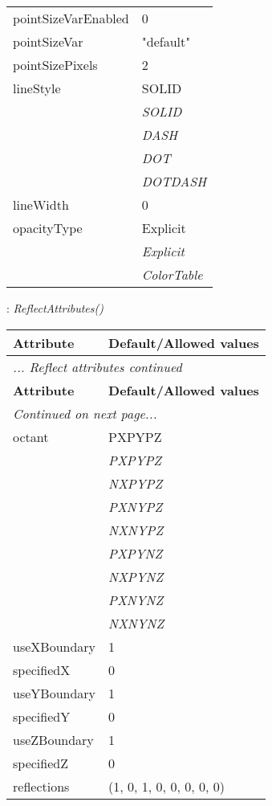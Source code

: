 \documentclass[10pt,a4paper]{report}
\begin{document}
\begin{longtable}{ll}
pointSizeVarEnabled  &  0 \\
pointSizeVar  &  "default" \\
pointSizePixels  &  2 \\
lineStyle  &  SOLID   \\
 & {\it  SOLID} \\
 & {\it  DASH} \\
 & {\it  DOT} \\
 & {\it  DOTDASH} \\
lineWidth  &  0 \\
opacityType  &  Explicit   \\
 & {\it  Explicit} \\
 & {\it  ColorTable} \\
\end{longtable}

\newpage

{}
: {\it ReflectAttributes() }\\[-3mm]

\begin{longtable}{ll}
{\bf Attribute} & {\bf Default/Allowed values} \\
\hline \hline
\endfirsthead
\multicolumn{2}{l}{{\it ... Reflect attributes continued}} \\
{\bf Attribute} & {\bf Default/Allowed values} \\
\hline \hline
\endhead
\hline
\multicolumn{2}{l}{{\it Continued on next page...}} \\
\endfoot
\hline
\endlastfoot

octant  &  PXPYPZ   \\
 & {\it  PXPYPZ} \\
 & {\it  NXPYPZ} \\
 & {\it  PXNYPZ} \\
 & {\it  NXNYPZ} \\
 & {\it  PXPYNZ} \\
 & {\it  NXPYNZ} \\
 & {\it  PXNYNZ} \\
 & {\it  NXNYNZ} \\
useXBoundary  &  1 \\
specifiedX  &  0 \\
useYBoundary  &  1 \\
specifiedY  &  0 \\
useZBoundary  &  1 \\
specifiedZ  &  0 \\
reflections  &  (1, 0, 1, 0, 0, 0, 0, 0) \\
\end{longtable}
\end{document}
